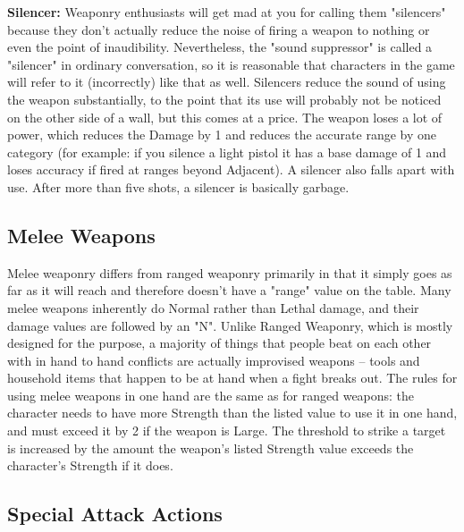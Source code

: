 \textbf{Silencer:} Weaponry enthusiasts will get mad at you for calling them "silencers" because they don't actually reduce the noise of firing a weapon to nothing or even the point of inaudibility. Nevertheless, the "sound suppressor" is called a "silencer" in ordinary conversation, so it is reasonable that characters in the game will refer to it (incorrectly) like that as well. Silencers reduce the sound of using the weapon substantially, to the point that its use will probably not be noticed on the other side of a wall, but this comes at a price. The weapon loses a lot of power, which reduces the Damage by 1 and reduces the accurate range by one category (for example: if you silence a light pistol it has a base damage of 1 and loses accuracy if fired at ranges beyond Adjacent). A silencer also falls apart with use. After more than five shots, a silencer is basically garbage.

\subsection{Melee Weapons} 

\hspace{\parindent} Melee weaponry differs from ranged weaponry primarily in that it simply goes as far as it will reach and therefore doesn't have a "range" value on the table. Many melee weapons inherently do Normal rather than Lethal damage, and their damage values are followed by an "N". Unlike Ranged Weaponry, which is mostly designed for the purpose, a majority of things that people beat on each other with in hand to hand conflicts are actually improvised weapons -- tools and household items that happen to be at hand when a fight breaks out. The rules for using melee weapons in one hand are the same as for ranged weapons: the character needs to have more Strength than the listed value to use it in one hand, and must exceed it by 2 if the weapon is Large. The threshold to strike a target is increased by the amount the weapon's listed Strength value exceeds the character's Strength if it does.

\subsection{Special Attack Actions} 

